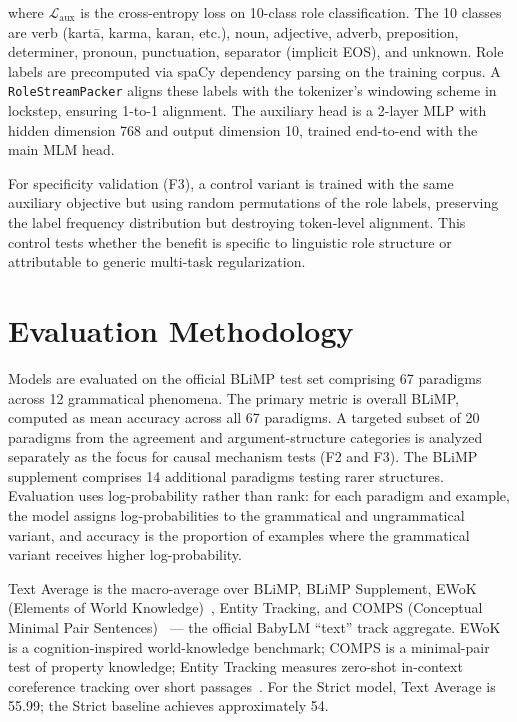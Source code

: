 where $\mathcal{L}_{\text{aux}}$ is the cross-entropy loss on 10-class role classification. The 10 classes are verb (kartā, karma, karan, etc.), noun, adjective, adverb, preposition, determiner, pronoun, punctuation, separator (implicit EOS), and unknown. Role labels are precomputed via spaCy dependency parsing on the training corpus. A \texttt{RoleStreamPacker} aligns these labels with the tokenizer's windowing scheme in lockstep, ensuring 1-to-1 alignment. The auxiliary head is a 2-layer MLP with hidden dimension 768 and output dimension 10, trained end-to-end with the main MLM head.

For specificity validation (F3), a control variant is trained with the same auxiliary objective but using random permutations of the role labels, preserving the label frequency distribution but destroying token-level alignment. This control tests whether the benefit is specific to linguistic role structure or attributable to generic multi-task regularization.

\section{Evaluation Methodology}

Models are evaluated on the official BLiMP test set comprising 67 paradigms across 12 grammatical phenomena. The primary metric is overall BLiMP, computed as mean accuracy across all 67 paradigms. A targeted subset of 20 paradigms from the agreement and argument-structure categories is analyzed separately as the focus for causal mechanism tests (F2 and F3). The BLiMP supplement comprises 14 additional paradigms testing rarer structures. Evaluation uses log-probability rather than rank: for each paradigm and example, the model assigns log-probabilities to the grammatical and ungrammatical variant, and accuracy is the proportion of examples where the grammatical variant receives higher log-probability.

Text Average is the macro-average over BLiMP, BLiMP Supplement, EWoK (Elements of World Knowledge)~\cite{Ivanova2024EWoK}, Entity Tracking, and COMPS (Conceptual Minimal Pair Sentences)~\cite{Misra2023COMPS} --- the official BabyLM ``text'' track aggregate. EWoK is a cognition-inspired world-knowledge benchmark; COMPS is a minimal-pair test of property knowledge; Entity Tracking measures zero-shot in-context coreference tracking over short passages~\cite{Warstadt2023}. For the Strict model, Text Average is 55.99; the Strict baseline achieves approximately 54.

